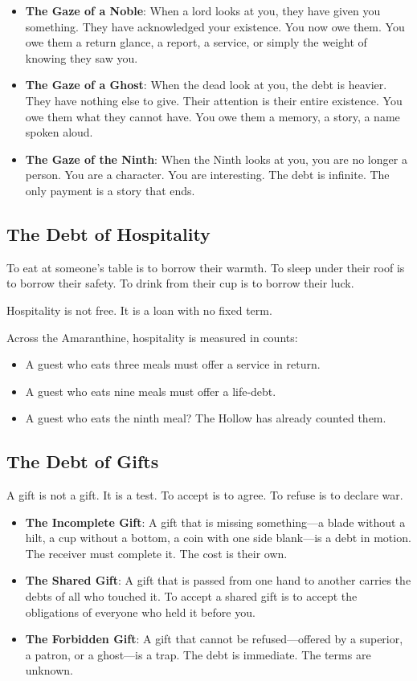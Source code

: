 \documentclass[11pt,letterpaper,twoside]{book}
\begin{document}
\begin{itemize}
\item \textbf{The Gaze of a Noble}: When a lord looks at you, they have given you something. They have acknowledged your existence. You now owe them. You owe them a return glance, a report, a service, or simply the weight of knowing they saw you.
\item \textbf{The Gaze of a Ghost}: When the dead look at you, the debt is heavier. They have nothing else to give. Their attention is their entire existence. You owe them what they cannot have. You owe them a memory, a story, a name spoken aloud.
\item \textbf{The Gaze of the Ninth}: When the Ninth looks at you, you are no longer a person. You are a character. You are interesting. The debt is infinite. The only payment is a story that ends.
\end{itemize}

\subsection{The Debt of Hospitality}

To eat at someone's table is to borrow their warmth. To sleep under their roof is to borrow their safety. To drink from their cup is to borrow their luck.

Hospitality is not free. It is a loan with no fixed term.

Across the Amaranthine, hospitality is measured in counts:
\begin{itemize}
\item A guest who eats three meals must offer a service in return.
\item A guest who eats nine meals must offer a life-debt.
\item A guest who eats the ninth meal? The Hollow has already counted them.
\end{itemize}

\subsection{The Debt of Gifts}

A gift is not a gift. It is a test. To accept is to agree. To refuse is to declare war.

\begin{itemize}
\item \textbf{The Incomplete Gift}: A gift that is missing something---a blade without a hilt, a cup without a bottom, a coin with one side blank---is a debt in motion. The receiver must complete it. The cost is their own.
\item \textbf{The Shared Gift}: A gift that is passed from one hand to another carries the debts of all who touched it. To accept a shared gift is to accept the obligations of everyone who held it before you.
\item \textbf{The Forbidden Gift}: A gift that cannot be refused---offered by a superior, a patron, or a ghost---is a trap. The debt is immediate. The terms are unknown.
\end{itemize}
\end{document}
